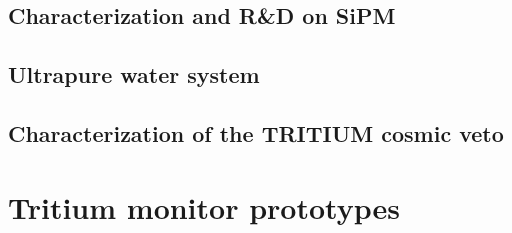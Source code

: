 \documentclass[12pt,a4paper]{book}
\begin{document}
	\section[Characterization SiPM]{Characterization and R\&D on SiPM}\label{sec:CharacterizationSiPM}
	
	\newpage
	
	\section{Ultrapure water system}\label{sec:CharacterizationUltraPureWaterSystem}
	
					 
	\section[Characterization of the cosmic veto]{Characterization of the TRITIUM cosmic veto}\label{sec:TritiumActiveVeto}
	
	\newpage
		
	
					 

\chapter{Tritium monitor prototypes}\label{chap:Prototypes}	
	
\end{document}
